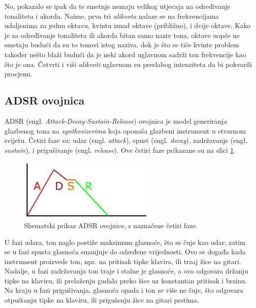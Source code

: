 \documentclass[a4paper, 10pt, twocolumn]{article}
\begin{document}
No, pokazalo se ipak da te smetnje nemaju velikog utjecaja na određivanje tonaliteta i akorda.
Naime, prva tri \textit{alikvota} nalaze se na frekvencijama udaljenima za jednu oktavu, kvintu iznad oktave (približno), i dvije oktave.
Kako je za određivanje tonaliteta ili akorda bitan samo naziv tona, oktave uopće ne smetaju budući da su to tonovi istog naziva, dok je što se tiče kvinte problem također nešto blaži budući da je neki akord uglavnom sadrži ton frekvencije kao što je ona.
Četvrti i viši \textit{alikvoti} uglavnom su preslabog intenziteta da bi pokvarili procjenu.

\subsection{ADSR ovojnica}
\label{ss:adsr}
ADSR (engl. \textit{Attack-Decay-Sustain-Release}) ovojnica je model generiranja glazbenog tona na \textit{synthesizerima} koja oponaša glazbeni instrument u stvarnom svijetu.
Četiri faze su: udar (engl. \textit{attack}), spust (engl. \textit{decay}), zadržavanje (engl. \textit{sustain}), i prigušivanje (engl. \textit{release}).
Ove četiri faze prikazane su na slici \ref{fig:adsr}.

\begin{figure}[htb]
  \includegraphics[width=\linewidth]{Adsr3}
  \caption{Shematski prikaz ADSR ovojnice, s naznačene četiri faze.}
  \label{fig:adsr}
\end{figure}

U fazi udara, ton naglo postiže maksimum glasnoće, što se čuje kao udar;
zatim se u fazi spusta glasnoća smanjuje do određene vrijednosti.
Ovo se događa kada instrument proizvede ton, npr. na pritisak tipke klavira, ili trzaj žice na gitari.
Nadalje, u fazi zadržavanja ton traje i stalne je glasnoće, a ovo odgovara držanju tipke na klaviru, ili prelaženju gudala preko žice uz konstantan pritisak i brzinu.
Na kraju u fazi prigušivanja, glasnoća opada i ton se više ne čuje, što odgovara otpuštanju tipke na klaviru, ili prigušenju žice na gitari prstima.
\end{document}
